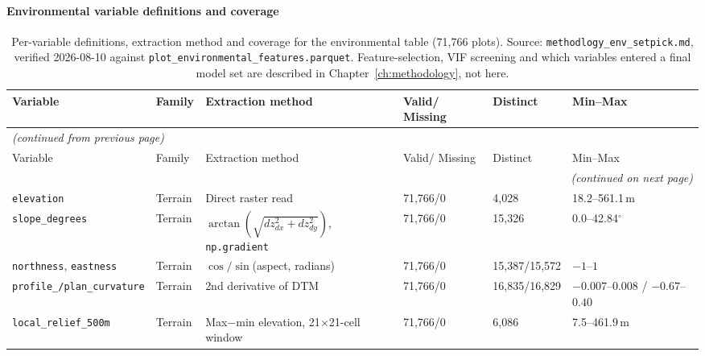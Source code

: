 \documentclass[logo,msc,ai]{infthesis}           %
\begin{document}
\paragraph*{Environmental variable definitions and coverage}
{\tiny
\setlength{\tabcolsep}{2pt}
\renewcommand{\arraystretch}{0.9}
\begin{longtable}{p{2.3cm}p{1.6cm}p{3.0cm}p{1.3cm}p{1.1cm}p{2.3cm}}
\caption{Per-variable definitions, extraction method and coverage for the environmental table
(71,766 plots). Source: \texttt{methodlogy\_env\_setpick.md}, verified 2026-08-10 against
\texttt{plot\_environmental\_features.parquet}. Feature-selection, VIF screening and which
variables entered a final model set are described in Chapter~\ref{ch:methodology}, not here.}
\label{tab:data-env-variables_detail_app} \\
\hline
Variable & Family & Extraction method & Valid/ Missing & Distinct & Min--Max \\
\hline
\endfirsthead
\multicolumn{6}{l}{\normalfont\itshape (continued from previous page)} \\
\hline
Variable & Family & Extraction method & Valid/ Missing & Distinct & Min--Max \\
\hline
\endhead
\hline
\multicolumn{6}{r}{\normalfont\itshape (continued on next page)} \\
\endfoot
\hline
\endlastfoot
\texttt{elevation} & Terrain & Direct raster read & 71{,}766/0 & 4{,}028 & 18.2--561.1\,m \\
\texttt{slope\_degrees} & Terrain & $\arctan(\sqrt{dz_{dx}^2+dz_{dy}^2})$, \texttt{np.gradient} & 71{,}766/0 & 15{,}326 & 0.0--42.84$^\circ$ \\
\texttt{northness}, \texttt{eastness} & Terrain & $\cos/\sin$(aspect, radians) & 71{,}766/0 & 15{,}387/15{,}572 & $-1$--$1$ \\
\texttt{profile\_/plan\_curvature} & Terrain & 2nd derivative of DTM \citep{zevenbergen1987} & 71{,}766/0 & 16{,}835/16{,}829 & $-0.007$--$0.008$ / $-0.67$--$0.40$ \\
\texttt{local\_relief\_500m} & Terrain & Max$-$min elevation, 21$\times$21-cell window & 71{,}766/0 & 6{,}086 & 7.5--461.9\,m \\

\end{longtable}}
\end{document}
